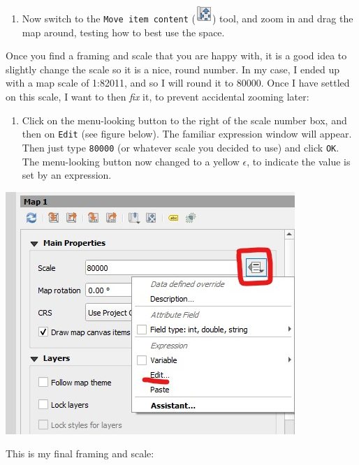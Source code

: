 \documentclass[
  letterpaper,
  DIV=11,
  numbers=noendperiod]{scrreprt}
\providecommand{\tightlist}{%
  \setlength{\itemsep}{0pt}\setlength{\parskip}{0pt}}\usepackage{longtable,booktabs,array}
\begin{document}
\begin{enumerate}
\def\labelenumi{(\arabic{enumi})}
\setcounter{enumi}{215}
\tightlist
\item
  Now switch to the \texttt{Move\ item\ content}
  (\includegraphics{index_files/mediabag/mActionMoveItemConte1.png})
  tool, and zoom in and drag the map around, testing how to best use the
  space.
\end{enumerate}

Once you find a framing and scale that you are happy with, it is a good
idea to slightly change the scale so it is a nice, round number. In my
case, I ended up with a map scale of 1:82011, and so I will round it to
80000. Once I have settled on this scale, I want to then \emph{fix} it,
to prevent accidental zooming later:

\begin{enumerate}
\def\labelenumi{(\arabic{enumi})}
\setcounter{enumi}{216}
\tightlist
\item
  Click on the menu-looking button to the right of the scale number box,
  and then on \texttt{Edit} (see figure below). The familiar expression
  window will appear. Then just type \texttt{80000} (or whatever scale
  you decided to use) and click \texttt{OK}. The menu-looking button now
  changed to a yellow \(\epsilon\), to indicate the value is set by an
  expression.
\end{enumerate}

\includegraphics{images/lab_7/lab7_fig13_setscale.jpg}

This is my final framing and scale:
\end{document}
